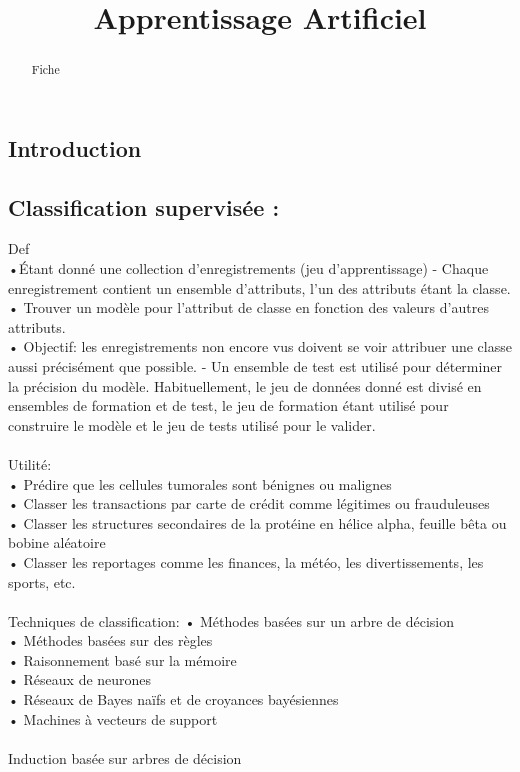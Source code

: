 \documentclass[5pt]{article}
\begin{document}
\begin{scriptsize}
\title{Apprentissage Artificiel}
\date{}
\begin{abstract}
Fiche
\end{abstract}
\subsection{Introduction}
\subsection{Classification supervisée : }
Def\\
•Étant donné une collection d'enregistrements (jeu d'apprentissage) - Chaque enregistrement contient un ensemble d'attributs, l'un des attributs étant la classe.\\
• Trouver un modèle pour l'attribut de classe en fonction des valeurs d'autres attributs.\\
• Objectif: les enregistrements non encore vus doivent se voir attribuer une classe aussi précisément que possible. - Un ensemble de test est utilisé pour déterminer la précision du modèle. Habituellement, le jeu de données donné est divisé en ensembles de formation et de test, le jeu de formation étant utilisé pour construire le modèle et le jeu de tests utilisé pour le valider.\\
\\
Utilité:\\
• Prédire que les cellules tumorales sont bénignes ou malignes\\
• Classer les transactions par carte de crédit comme légitimes ou frauduleuses\\
• Classer les structures secondaires de la protéine en hélice alpha, feuille bêta ou bobine aléatoire\\
• Classer les reportages comme les finances, la météo, les divertissements, les sports, etc.\\
\\
Techniques de classification:
• Méthodes basées sur un arbre de décision\\
• Méthodes basées sur des règles\\
• Raisonnement basé sur la mémoire\\
• Réseaux de neurones\\
• Réseaux de Bayes naïfs et de croyances bayésiennes\\
• Machines à vecteurs de support\\
\\
Induction basée sur arbres de décision\\

\end{scriptsize}
\end{document}
